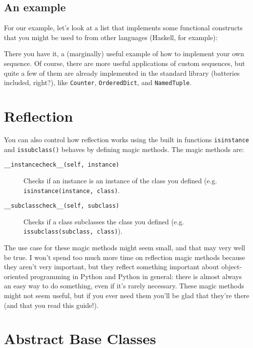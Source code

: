 \documentclass[a4paper,11pt]{article}
\newcommand{\code}[1]{\texttt{#1}}
\begin{document}
\subsection{An example}


For our example, let's look at a list that implements some functional constructs that you might be used to from other languages (Haskell, for example):



\noindent
There you have it, a (marginally) useful example of how to implement your own sequence. Of course, there are more useful applications of custom sequences, but quite a few of them are already implemented in the standard library (batteries included, right?), like \code{Counter}, \code{OrderedDict}, and \code{NamedTuple}.

\section{Reflection}

You can also control how reflection works using the built in functions \code{isinstance} and \code{issubclass()} behaves by defining magic methods. The magic methods are:

\begin{description}

\item[\code{__instancecheck__(self, instance)}]
Checks if an instance is an instance of the class you defined (e.g. \code{isinstance(instance, class)}.
\item[\code{__subclasscheck__(self, subclass)}]
Checks if a class subclasses the class you defined (e.g. \code{issubclass(subclass, class)}).

\end{description}

The use case for these magic methods might seem small, and that may very well be true. I won't spend too much more time on reflection magic methods because they aren't very important, but they reflect something important about object-oriented programming in Python and Python in general: there is almost always an easy way to do something, even if it's rarely necessary. These magic methods might not seem useful, but if you ever need them you'll be glad that they're there (and that you read this guide!).

\section{Abstract Base Classes}
\end{document}
